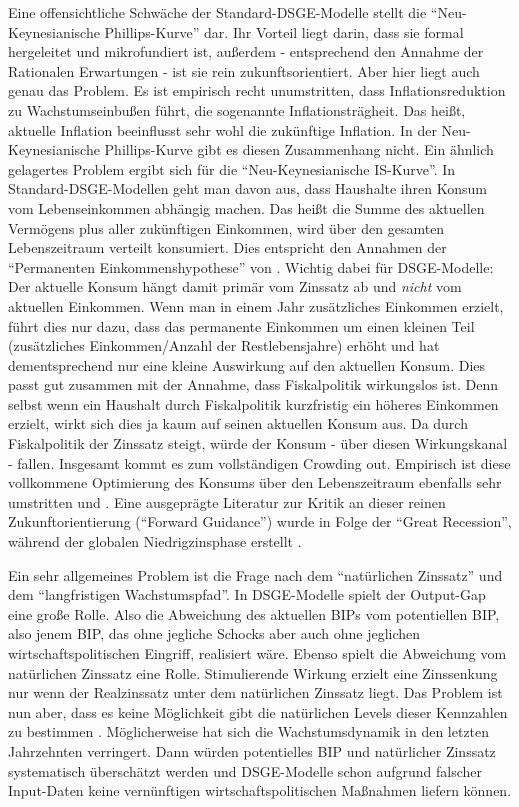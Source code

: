 Eine offensichtliche Schwäche der Standard-DSGE-Modelle stellt die "`Neu-Keynesianische Phillips-Kurve"' dar. Ihr Vorteil liegt darin, dass sie formal hergeleitet und mikrofundiert ist, außerdem - entsprechend den Annahme der Rationalen Erwartungen - ist sie rein zukunftsorientiert. Aber hier liegt auch genau das Problem. Es ist empirisch recht unumstritten, dass Inflationsreduktion zu Wachstumseinbußen führt, die sogenannte Inflationsträgheit. Das heißt, aktuelle Inflation beeinflusst sehr wohl die zukünftige Inflation. In der Neu-Keynesianische Phillips-Kurve gibt es diesen Zusammenhang nicht.  Ein ähnlich gelagertes Problem ergibt sich für die "`Neu-Keynesianische IS-Kurve"'. In Standard-DSGE-Modellen geht man davon aus, dass Haushalte ihren Konsum vom Lebenseinkommen abhängig machen. Das heißt die Summe des aktuellen Vermögens plus aller zukünftigen Einkommen, wird über den gesamten Lebenszeitraum verteilt konsumiert. Dies entspricht den Annahmen der "`Permanenten Einkommenshypothese"' von \textcite{Friedman1957}. Wichtig dabei für DSGE-Modelle: Der aktuelle Konsum hängt damit primär vom Zinssatz ab und \textit{nicht} vom aktuellen Einkommen. Wenn man in einem Jahr zusätzliches Einkommen erzielt, führt dies nur dazu, dass das permanente Einkommen um einen kleinen Teil (zusätzliches Einkommen/Anzahl der Restlebensjahre) erhöht und hat dementsprechend nur eine kleine Auswirkung auf den aktuellen Konsum. Dies passt gut zusammen mit der Annahme, dass Fiskalpolitik wirkungslos ist. Denn selbst wenn ein Haushalt durch Fiskalpolitik kurzfristig ein höheres Einkommen erzielt, wirkt sich dies ja kaum auf seinen aktuellen Konsum aus. Da durch Fiskalpolitik der Zinssatz steigt, würde der Konsum - über diesen Wirkungskanal - fallen. Insgesamt kommt es zum vollständigen Crowding out. Empirisch ist diese vollkommene Optimierung des Konsums über den Lebenszeitraum ebenfalls sehr umstritten \parencite[S. 354]{Romer2019} und \parencite[S. 262]{Gali2015}. Eine ausgeprägte Literatur zur Kritik an dieser reinen Zukunftorientierung ("`Forward Guidance"') wurde in Folge der "`Great Recession"', während der globalen Niedrigzinsphase erstellt \parencite{DelNegro2015}.

Ein sehr allgemeines Problem ist die Frage nach dem "`natürlichen Zinssatz"' und dem "`langfristigen Wachstumspfad"'. In DSGE-Modelle spielt der Output-Gap eine große Rolle. Also die Abweichung des aktuellen BIPs vom potentiellen BIP, also jenem BIP, das ohne jegliche Schocks aber auch ohne jeglichen wirtschaftspolitischen Eingriff, realisiert wäre. Ebenso spielt die Abweichung vom natürlichen Zinssatz eine Rolle. Stimulierende Wirkung erzielt eine Zinssenkung nur wenn der Realzinssatz unter dem natürlichen Zinssatz liegt. Das Problem ist nun aber, dass es keine Möglichkeit gibt die natürlichen Levels dieser Kennzahlen zu bestimmen \parencite[S. 263]{Gali2015}.
Möglicherweise hat sich die Wachstumsdynamik in den letzten Jahrzehnten verringert. Dann würden potentielles BIP und natürlicher Zinssatz systematisch überschätzt werden und DSGE-Modelle schon aufgrund falscher Input-Daten keine vernünftigen wirtschaftspolitischen Maßnahmen liefern können.

